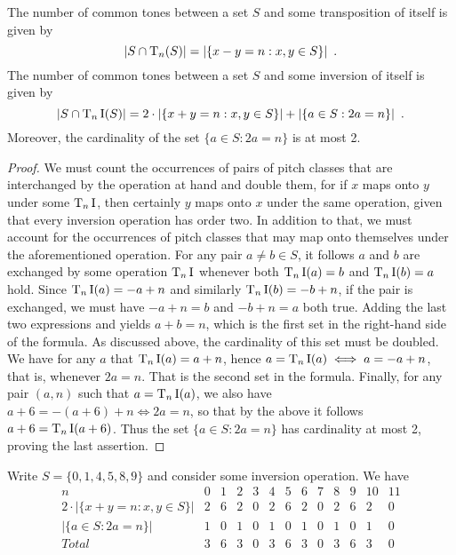 \begin{theorem}
	\label{rahn-common-tone}
	\cite[10]{Rahn1975}
	The number of common tones between a set $S$ and some transposition of itself is given by
	\begin{equation}
		|S \cap \operatorname{T}_n(S)| = |\{x - y = n : x, y \in S\}| \enspace.
	\end{equation}
	The number of common tones between a set $S$ and some inversion of itself is given by
	\begin{equation}
		|S \cap \operatorname{T}_n\operatorname{I}(S)| = 2 \cdot |\{x + y = n : x, y \in S\}| +
		|\{a \in S : 2a = n\}| \enspace.
	\end{equation}
	Moreover, the cardinality of the set $\{a \in S : 2a = n\}$ is at most 2.
	\begin{proof}
		We must count the occurrences of pairs of pitch classes that are interchanged by
		the operation at hand and double them, for if $x$ maps onto $y$ under some $\operatorname{T}_n\operatorname{I}$,
		then certainly $y$ maps onto $x$ under the same operation, given that every inversion
		operation has order two. In addition to that, we must account for the occurrences of
		pitch classes that may map onto themselves under the aforementioned operation. For
		any pair $a \ne b \in S$, it follows $a$ and $b$ are exchanged by some operation
		$\operatorname{T}_n\operatorname{I}$ whenever both $\operatorname{T}_n\operatorname{I}(a) = b$ and $\operatorname{T}_n\operatorname{I}(b) = a$ hold. Since
		$\operatorname{T}_n\operatorname{I}(a) = -a + n$ and similarly $\operatorname{T}_n\operatorname{I}(b) = -b + n$, if the pair is exchanged,
		we must have $-a + n = b$ and $-b + n = a$ both true. Adding the last two
		expressions and yields $a + b = n$, which is the first set in the right-hand side
		of the formula. As discussed above, the cardinality of this set must be doubled.
		We have for any $a$ that $\operatorname{T}_n\operatorname{I}(a) = a + n$, hence $a = \operatorname{T}_n\operatorname{I}(a) \iff a = -a + n$,
		that is, whenever $2a = n$. That is the second set in the formula. Finally, for
		any pair $(a, n)$ such that $a = \operatorname{T}_n\operatorname{I}(a)$, we also have
		$a + 6 = -(a + 6) + n \iff 2a = n$, so that by the above it follows
		$a + 6 = \operatorname{T}_n\operatorname{I}(a + 6)$. Thus the set $\{a \in S : 2a = n\}$ has cardinality
		at most 2, proving the last assertion.
	\end{proof}
\end{theorem}

\begin{example}
	\label{rahn-example}
	\cite[11]{Rahn1975}
	Write $S = \{ 0, 1, 4, 5, 8, 9 \}$ and consider some inversion operation. We have
	\begin{equation}
		\begin{array}{ *{13}{c} }
			n & 0 & 1 & 2 & 3 & 4 & 5 & 6 & 7 & 8 & 9 & 10 & 11 \\
			2 \cdot |\{x + y = n : x, y \in S\}| &
			2 & 6 & 2 & 0 & 2 & 6 & 2 & 0 & 2 & 6 & 2 & 0 \\
			|\{a \in S : 2a = n\}| & 1 & 0 & 1 & 0 & 1 & 0 & 1 & 0 & 1 & 0 & 1 & 0 \\
			Total & 3 & 6 & 3 & 0 & 3 & 6 & 3 & 0 & 3 & 6 & 3 & 0
		\end{array}
	\end{equation}
\end{example}

